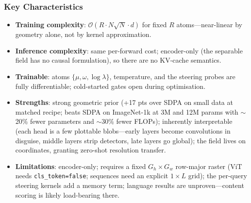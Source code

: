 \subsubsection{Key Characteristics}
\begin{itemize}[leftmargin=*]
    \item \textbf{Training complexity}: $\mathcal{O}(R \cdot N \sqrt{N} \cdot d)$ for fixed $R$ atoms---near-linear by geometry alone, not by kernel approximation.
    \item \textbf{Inference complexity}: same per-forward cost; encoder-only (the separable field has no causal formulation), so there are no KV-cache semantics.
    \item \textbf{Trainable}: atoms $\{\mu, \omega, \log\lambda\}$, temperature, and the steering probes are fully differentiable; cold-started gates open during optimisation.
    \item \textbf{Strengths}: strong geometric prior (+17 pts over SDPA on small data at matched recipe; beats SDPA on ImageNet-1k at 3M and 12M params with $\sim$20\% fewer parameters and $\sim$30\% fewer FLOPs); inherently interpretable (each head is a few plottable blobs---early layers become convolutions in disguise, middle layers strip detectors, late layers go global); the field lives on coordinates, granting zero-shot resolution transfer.
    \item \textbf{Limitations}: encoder-only; requires a fixed $G_h \times G_w$ row-major raster (ViT needs \texttt{cls\_token=false}; sequences need an explicit $1 \times L$ grid); the per-query steering kernels add a memory term; language results are unproven---content scoring is likely load-bearing there.
\end{itemize}
